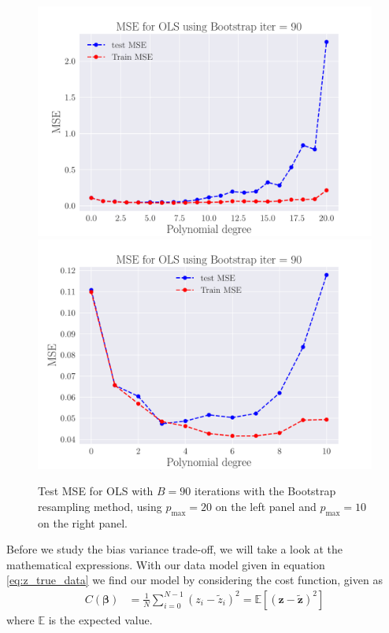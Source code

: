 \documentclass[reprint,english,notitlepage,aps,nobalancelastpage,nofootinbib]{revtex4-1}  %
\begin{document}
\begin{figure}[H]
	\includegraphics[width=\linewidth]{MSE_OLS_n30_eps02_pol20_Bootstrap_re90.pdf}
	\endminipage\hfill
	\includegraphics[width=\linewidth]{MSE_OLS_n30_eps02_pol10_Bootstrap_re90.pdf}
	\endminipage
	\caption{Test MSE for OLS with $B=90$ iterations with the Bootstrap resampling method, using $p_\text{max}=20$ on the left panel and $p_\text{max}=10$ on the right panel.}
  \label{fig:OLS_overfitting}
\end{figure}

Before we study the bias variance trade-off, we will take a look at the mathematical expressions. With our data model given in equation \eqref{eq:z_true_data} we find our model by considering the cost function, given as
\begin{align*}
  C(\bm{\beta}) &= \frac{1}{N} \sum_{i=0}^{N-1} (z_i - \tilde{z}_i)^2 = \mathbb{E}[(\mathbf{z}-\mathbf{\tilde{z}})^2]
\end{align*}
where $\mathbb{E}$ is the expected value. %
\end{document}
